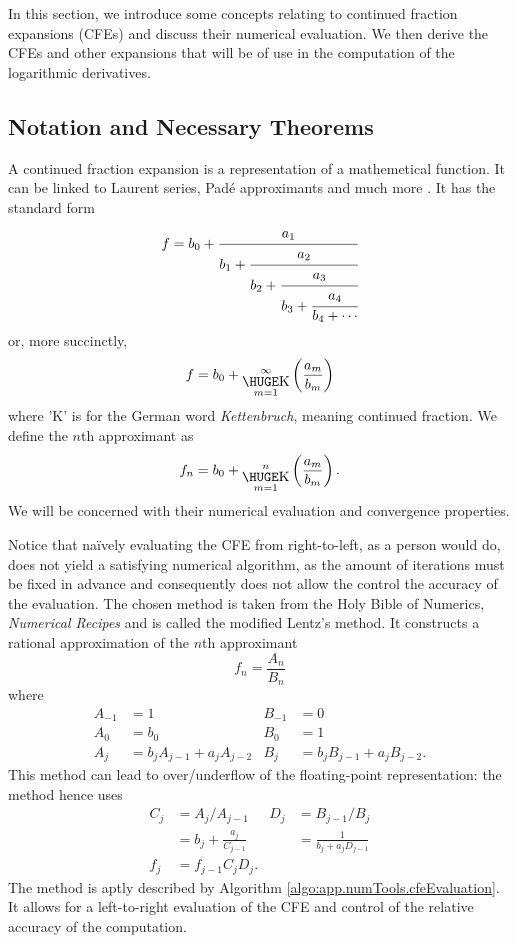 In this section, we introduce some concepts relating to 
continued fraction expansions (CFEs) and discuss their numerical
evaluation. We then derive the CFEs and other expansions that will
be of use in the computation of the logarithmic derivatives.

\subsection{Notation and Necessary Theorems}
A continued fraction expansion is a representation
of a mathemetical function. It can be linked to 
Laurent series, Padé approximants and much more 
\cite{CUY2008}. It has the standard form 
  \begin{equation}
    f = b_0+\cfrac{a_1}{b_1+\cfrac{a_2}{b_2+\cfrac{a_3}{b_3+\cfrac{a_4}{b_4+\cdots}}}}
  \end{equation}
or, more succinctly, 
  \begin{equation}
   f = b_0 + \bigk_{m=1}^\infty\left(\frac{a_m}{b_m}\right)
  \end{equation}
where 'K' is for the German word \textit{Kettenbruch}, meaning continued fraction.
We define the $n$th approximant as
  \begin{equation}
   f_n = b_0 + \bigk_{m=1}^n\left(\frac{a_m}{b_m}\right).
  \end{equation}
We will be concerned with their numerical evaluation and convergence properties.

Notice that naïvely evaluating the CFE from right-to-left, as a person would do, 
does not yield a satisfying numerical algorithm, as the amount of iterations 
must be fixed in advance and consequently does not allow the control the 
accuracy of the evaluation. The chosen method is taken from the Holy Bible
of Numerics, \textit{Numerical Recipes} \cite{PRE2007} and is called 
the modified Lentz's method. It constructs a rational approximation
of the $n$th approximant 
  \begin{equation}
    f_n = \frac{A_n}{B_n}
  \end{equation}
where 
  \begin{align}
   A_{-1} 	&=1 			& B_{-1} 	&=0	\nonumber\\
   A_0		&= b_0			& B_0		&=1	\\
   A_j		&=b_jA_{j-1}+a_jA_{j-2}	& B_j 		&=b_jB_{j-1}+a_jB_{j-2}.\nonumber
  \end{align}
This method can lead to over/underflow of the floating-point representation: 
the method hence uses 
  \begin{align}
    C_j &= A_j/A_{j-1}			&	D_j	&= B_{j-1}/B_j	\nonumber\\
    	&= b_j+\frac{a_j}{C_{j-1}}	&		&= \frac{1}{b_j+a_jD_{j-1}}\\
    f_j	&= f_{j-1}C_jD_j.\nonumber
  \end{align}
The method is aptly described by Algorithm \ref{algo:app.numTools.cfeEvaluation}.
It allows for a left-to-right evaluation of the CFE and control of the relative
accuracy of the computation. 


